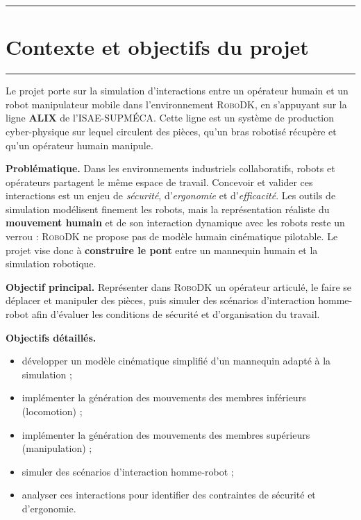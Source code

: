 \documentclass[12pt]{article}
\newcommand{\barre}{\noindent\textcolor{supmerange}{\rule{\textwidth}{3pt}}}
\newcommand{\rsection}[1]{%
  \barre\par\vspace{2pt}%
  \section{#1}%
  \vspace{-6pt}\barre\par\vspace{0.7em}}
\begin{document}
\rsection{Contexte et objectifs du projet}

Le projet porte sur la simulation d'interactions entre un opérateur humain et un
robot manipulateur mobile dans l'environnement \textsc{RoboDK}, en s'appuyant sur
la ligne \textbf{ALIX} de l'ISAE-SUPMÉCA.
Cette ligne est un système de production cyber-physique sur lequel circulent des
pièces, qu'un bras robotisé récupère et qu'un opérateur humain manipule.

\medskip
\noindent\textbf{Problématique.}
Dans les environnements industriels collaboratifs, robots et opérateurs partagent
le même espace de travail. Concevoir et valider ces interactions est un enjeu de
\emph{sécurité}, d'\emph{ergonomie} et d'\emph{efficacité}. Les outils de
simulation modélisent finement les robots, mais la représentation réaliste du
\textbf{mouvement humain} et de son interaction dynamique avec les robots reste
un verrou : \textsc{RoboDK} ne propose pas de modèle humain cinématique pilotable.
Le projet vise donc à \textbf{construire le pont} entre un mannequin humain et la
simulation robotique.

\medskip
\noindent\textbf{Objectif principal.}
Représenter dans \textsc{RoboDK} un opérateur articulé, le faire se déplacer et
manipuler des pièces, puis simuler des scénarios d'interaction homme-robot afin
d'évaluer les conditions de sécurité et d'organisation du travail.

\medskip
\noindent\textbf{Objectifs détaillés.}
\begin{itemize}[noitemsep]
  \item développer un modèle cinématique simplifié d'un mannequin adapté à la simulation ;
  \item implémenter la génération des mouvements des membres inférieurs (locomotion) ;
  \item implémenter la génération des mouvements des membres supérieurs (manipulation) ;
  \item simuler des scénarios d'interaction homme-robot ;
  \item analyser ces interactions pour identifier des contraintes de sécurité et d'ergonomie.
\end{itemize}


\end{document}
